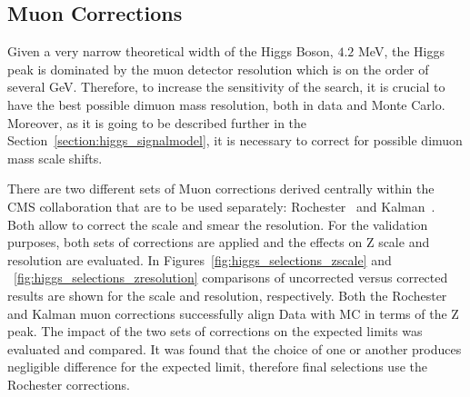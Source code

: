 \subsection{Muon Corrections}
Given a very narrow theoretical width of the Higgs Boson, $4.2$ MeV, the Higgs peak is dominated by the muon detector resolution which is on the order of several GeV. Therefore, to increase the sensitivity of the search, it is crucial to have the best possible dimuon mass resolution, both in data and Monte Carlo. Moreover, as it is going to be described further in the Section~\ref{section:higgs_signalmodel}, it is necessary to correct for possible dimuon mass scale shifts.

There are two different sets of Muon corrections derived centrally within the CMS collaboration that are to be used separately: Rochester~\cite{CMSRochesterCorrections} and Kalman~\cite{CMSKalmanCorrections}. Both allow to correct the scale and smear the resolution. For the validation purposes, both sets of corrections are applied and the effects on Z scale and resolution are evaluated. In Figures~\ref{fig:higgs_selections_zscale} and ~\ref{fig:higgs_selections_zresolution} comparisons of uncorrected versus corrected results are shown for the scale and resolution, respectively. Both the Rochester and Kalman muon corrections successfully align Data with MC in terms of the Z peak. The impact of the two sets of corrections on the expected limits was evaluated and compared. It was found that the choice of one or another produces negligible difference for the expected limit, therefore final selections use the Rochester corrections.
